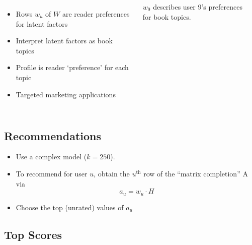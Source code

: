 \documentclass[handout]{beamer}
\begin{document}
\begin{frame}
\begin{columns}
 \begin{itemize}[<+->]
\item Rows $w_u$ of $W$ are reader preferences for latent factors\vspace{0.5cm}
\item Interpret latent factors as book topics\vspace{0.5cm}
\item Profile is reader `preference' for each topic\vspace{0.5cm}
\item Targeted marketing applications\vspace{0.5cm}
\end{itemize}

 \begin{table}
\centering
  
  \caption[User Profile]{$w_9$ describes user 9's preferences for book topics.}
  \label{tab:user-profile-9}
\end{table}
\end{columns}
\end{frame}




\subsection{Recommendations}


\begin{frame}
  \begin{itemize}[<+->]
 \item Use a complex model ($k=250$).\vfill
\item To recommend for user $u$,
obtain the $u^{\text{th}}$ row of the ``matrix completion'' A via
\[a_u = w_u \cdot H\] \vfill
\item Choose the top (unrated) values of $a_u$ \vfill
\end{itemize}

 
 
\end{frame}

\subsection{Top Scores}
\end{document}
